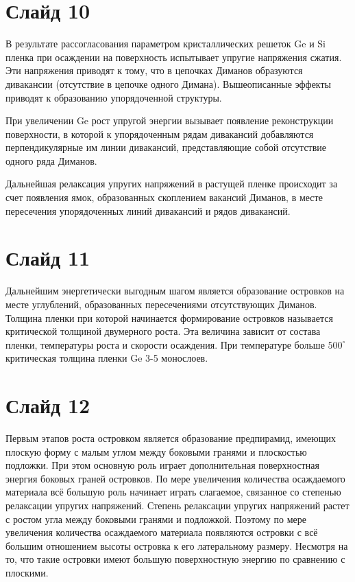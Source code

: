 \section*{Слайд 10}
В результате рассогласования	параметром кристаллических решеток Ge и Si пленка при осаждении на поверхность испытывает упругие напряжения сжатия. Эти напряжения приводят к тому, что в цепочках Диманов образуются дивакансии (отсутствие в цепочке одного Димана). Вышеописанные эффекты приводят к образованию упорядоченной структуры. 

При увеличении Ge рост упругой энергии вызывает появление реконструкции поверхности, в которой к  упорядоченным рядам дивакансий добавляются перпендикулярные им линии дивакансий, представляющие собой отсутствие одного ряда Диманов.  

Дальнейшая релаксация упругих напряжений в растущей пленке происходит за счет появления ямок, образованных скоплением вакансий Диманов, в месте пересечения
упорядоченных линий дивакансий и рядов дивакансий. 
\section*{Слайд 11}

Дальнейшим энергетически выгодным 
шагом является образование островков на месте углублений, образованных пересечениями отсутствующих Диманов. Толщина пленки при которой начинается формирование островков называется критической толщиной двумерного роста. Эта величина зависит от состава пленки, температуры роста и скорости осаждения. При температуре больше $500^{\circ}$ критическая толщина пленки Ge 3-5 монослоев. 

\section*{Слайд 12} %


Первым этапов роста островком является образование предпирамид, имеющих плоскую форму с малым углом между боковыми гранями и плоскостью подложки. При этом основную роль играет дополнительная поверхностная энергия боковых граней островков.
По мере увеличения количества осаждаемого материала всё большую роль начинает играть слагаемое, связанное со степенью релаксации упругих напряжений. Степень релаксации упругих напряжений растет с ростом угла между боковыми гранями и подложкой. Поэтому по мере увеличения количества осаждаемого материала появляются островки с всё большим отношением высоты островка к его латеральному размеру. Несмотря на то, что такие островки имеют большую поверхностную энергию  по сравнению с плоскими.


